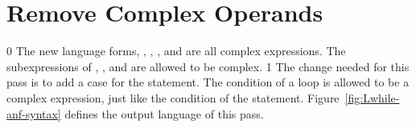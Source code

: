 \documentclass[7x10]{TimesAPriori_MIT}%
\def\racketEd{0}
\def\pythonEd{1}
\def\edition{1}
\newcommand{\pythonColor}[0]{}
\numberwithin{theorem}{chapter}
\numberwithin{definition}{chapter}
\numberwithin{equation}{chapter}
\begin{document}
\section{Remove Complex Operands}
\label{sec:rco-loop}

{\if\edition\racketEd
%
The new language forms, , , , and
 are all complex expressions. The subexpressions of
, , and  are allowed to be complex.
%
\fi}
{\if\edition\pythonEd\pythonColor
%
The change needed for this pass is to add a case for the 
statement. The condition of a  loop is allowed to be a
complex expression, just like the condition of the 
statement.
%
\fi}  
%
Figure~\ref{fig:Lwhile-anf-syntax} defines the output language
\LangLoopANF{} of this pass.

\newcommand{\LwhileMonadASTRacket}{
\begin{array}{rcl}
\Atm &::=& \VOID{} \\
\Exp &::=& \GETBANG{\Var}
      \MID \SETBANG{\Var}{\Exp} 
      \MID \BEGIN{\LP\Exp\ldots\RP}{\Exp} \\
      &\MID& \WHILE{\Exp}{\Exp}
\end{array}
}

\newcommand{\LwhileMonadASTPython}{
\begin{array}{rcl}
\Stmt{} &::=& \WHILESTMT{\Exp}{\Stmt^{+}} 
\end{array}
}
\end{document}
